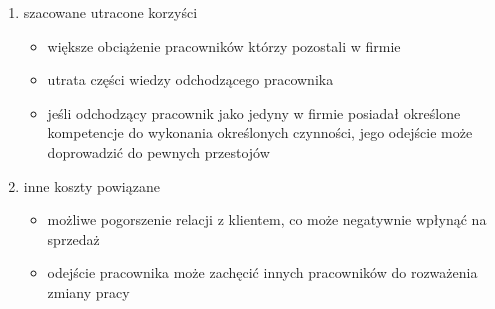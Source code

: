\begin{enumerate}
    \item szacowane utracone korzyści
    \begin{itemize}
        \item większe obciążenie pracowników którzy pozostali w firmie
        \item utrata części wiedzy odchodzącego pracownika
        \item jeśli odchodzący pracownik jako jedyny w firmie posiadał określone kompetencje do wykonania określonych czynności, jego odejście może doprowadzić do pewnych przestojów
    \end{itemize}
    \item inne koszty powiązane
    \begin{itemize}
        \item możliwe pogorszenie relacji z klientem, co może negatywnie wpłynąć na sprzedaż
        \item odejście pracownika może zachęcić innych pracowników do rozważenia zmiany pracy
    \end{itemize}
\end{enumerate}

\thispagestyle{normal}
